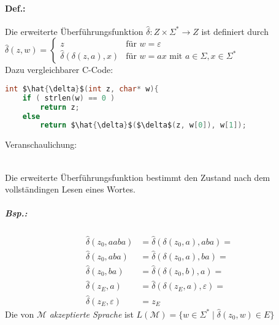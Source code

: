 \documentclass{scrreprt}
\begin{document}
\paragraph{Def.:} Die erweiterte Überführungsfunktion $\hat{\delta}:Z\times \Sigma^*\rightarrow Z$ ist definiert durch\\
$\hat{\delta}(z,w)=\begin{cases}
z & \text{für }w = \varepsilon\\
\hat{\delta}(\delta(z,a),x) & \text{für }w=ax \text{ mit } a\in \Sigma ,x \in \Sigma^*
\end{cases}$\\
Dazu vergleichbarer C-Code:
\begin{lstlisting}[language=C]
int $\hat{\delta}$(int z, char* w){
	if ( strlen(w) == 0 )
		return z;
	else
		return $\hat{\delta}$($\delta$(z, w[0]), w[1]);
\end{lstlisting}
Veranschaulichung:\\
\\
Die erweiterte Überführungsfunktion bestimmt den Zustand nach dem vollständingen Lesen eines Wortes.

\subparagraph{Bsp.:} \parskp
{}
\begin{align*}
\hat{\delta}(z_0, aaba) &= \hat{\delta}(\delta(z_0,a),aba)=\\
\hat{\delta}(z_0, aba) &= \hat{\delta}(\delta(z_0,a),ba)=\\
\hat{\delta}(z_0, ba) &= \hat{\delta}(\delta(z_0,b),a)=\\
\hat{\delta}(z_E, a) &= \hat{\delta}(\delta(z_E,a), \varepsilon)=\\
\hat{\delta}(z_E, \varepsilon) &= z_E
\end{align*}
Die von $\mathcal{M}$ \emph{akzeptierte Sprache} ist $L(\mathcal{M})=\{w\in \Sigma^* \;|\; \hat{\delta}(z_0, w) \in E\}$
\end{document}
